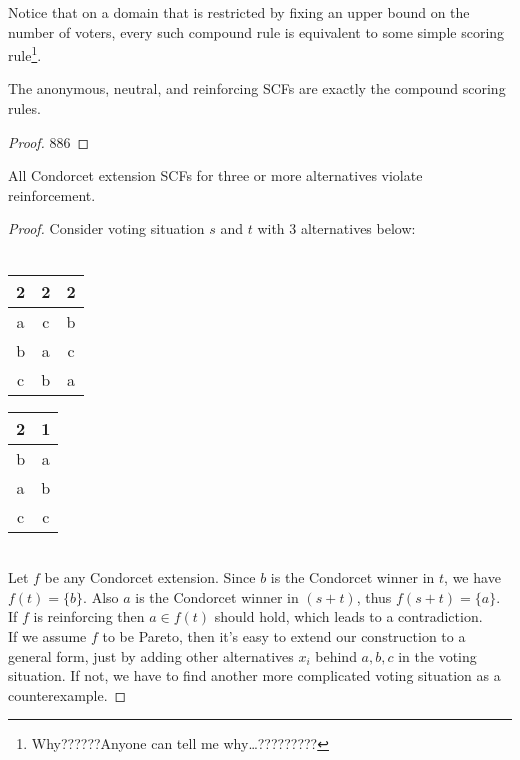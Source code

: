 Notice that on a domain that is restricted by fixing an upper bound on the number of voters, every such compound rule is equivalent to some simple scoring rule\footnote{Why??????Anyone can tell me why\dots?????????}.

\begin{theorem}
    The anonymous, neutral, and reinforcing SCFs are exactly the compound scoring rules.
\end{theorem}

\begin{proof}
    886
\end{proof}

\begin{proposition}
    All Condorcet extension SCFs for three or more alternatives violate reinforcement.
\end{proposition}

\begin{proof}
    Consider voting situation $s$ and $t$ with 3 alternatives below:\\
    ~\\
    \begin{minipage}{0.5\textwidth}
        \begin{center}
            \begin{tabular}{ccc}
                2 & 2 & 2\\
                \hline
                a & c & b\\
                b & a & c\\
                c & b & a
            \end{tabular}
        \end{center}
    \end{minipage}
    \begin{minipage}{0.4\textwidth}
            \begin{tabular}{cc}
                2 & 1\\
                \hline
                b & a \\
                a & b\\
                c & c
            \end{tabular}
    \end{minipage}
    \\
    Let $f$ be any Condorcet extension. Since $b$ is the Condorcet winner in $t$, we have $f(t) = \{b\}$. Also $a$ is the Condorcet winner in $(s+t)$, thus $f(s+t) = \{a\}$. If $f$ is reinforcing then $a \in f(t)$ should hold, which leads to a contradiction.\\
    If we assume $f$ to be Pareto, then it's easy to extend our construction to a general form, just by adding other alternatives $x_i$ behind $a,b,c$ in the voting situation. If not, we have to find another more complicated voting situation as a counterexample.
\end{proof}

